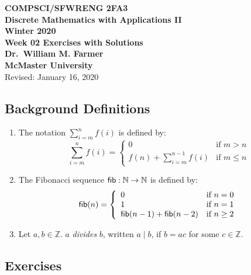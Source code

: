 \documentclass[11pt,fleqn]{article}
\newcommand{\bc}{\begin{center}}
\newcommand{\ec}{\end{center}}
\newcommand{\mname}[1]{\mbox{\sf #1}}
\begin{document}

\bc

  {\large \textbf{COMPSCI/SFWRENG 2FA3}}\\[2mm]
  {\large \textbf{Discrete Mathematics with Applications II}}\\[2mm]
  {\large \textbf{Winter 2020}}\\[8mm]
  {\huge \textbf{Week 02 Exercises with Solutions}}\\[6mm]
  {\large \textbf{Dr.~William M. Farmer}}\\[2mm]
  {\large \textbf{McMaster University}}\\[6mm]
  {\large Revised: January 16, 2020}

\ec

\medskip

\subsection*{Background Definitions}

\begin{enumerate}

  \item The notation $\sum^{n}_{i=m}f(i)$ is defined by: 
    \[\sum^{n}_{i=m}f(i) =
      \left\{\begin{array}{ll}
               0                          & \textrm{if } m > n\\
               f(n) + \sum^{n-1}_{i=m}f(i) & \textrm{if } m \le n
             \end{array}
      \right.\] 

  \item The Fibonacci sequence $\mname{fib} : \mathbb{N} \rightarrow
    \mathbb{N}$ is defined by:
    \[\mname{fib}(n) = 
      \left\{\begin{array}{ll}
               0 & \textrm{if } n = 0 \\
               1 & \textrm{if } n = 1 \\
               \mname{fib}(n-1) + \mname{fib}(n-2) & \textrm{if } n \ge 2
             \end{array}
      \right.\]

   \item Let $a,b \in \mathbb{Z}$.  $a$ \emph{divides} $b$, written $a
     \mid b$, if $b = ac$ for some $c \in \mathbb{Z}$.

\end{enumerate}

\subsection*{Exercises}
\end{document}
